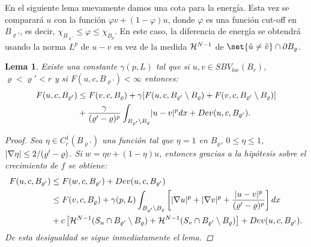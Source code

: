 \documentclass[a4paper,11pt,spanish, twoside, leqno]{tfm-uam}
\newtheorem{lema}[teo]{Lema}
\begin{document}
En el siguiente lema nuevamente damos una cota para la energía. Esta vez se comparará $u$ con la función $\varphi v+(1-\varphi)u$, donde $\varphi$ es una función cut-off en $B_{\varrho'}$, es decir, $\chi_{B_{\varrho'}}\le \varphi \le \chi_{B_{\varrho}}$. En este caso, la diferencia de energía se obtendrá usando la norma $L^{p}$ de $u-v$ en vez de la medida $\mathcal{H}^{N-1}$ de $\set{\tilde{u}\not = \tilde{v}}\cap \partial B_{\varrho}$. 
\begin{lema}\label{lema:estimacion de energia 2}
Existe una constante $\gamma(p,L)$ tal que si $u,v\in SBV_{loc}(B_{r})$, $\varrho<\varrho'<r$ y si $F(u,c,B_{\varrho'})<\infty$ entonces:
\begin{align*}
F(u,c,B_{\varrho'})&\leq F(v,c,B_{\varrho})+\gamma [F(u,c,B_{\varrho'}\setminus B_{\varrho})+F(v,c,B_{\varrho'}\setminus B_{\varrho})]
\\& +\dfrac{\gamma}{(\varrho'-\varrho)^{p}}\int_{B_{\varrho'}\setminus B_{\varrho}}\lvert u-v\rvert^{p}dx+Dev(u,c,B_{\varrho'}).
\end{align*}
\begin{proof}
Sea $\eta\in C_{c}^{1}(B_{\varrho'})$ una función tal que $\eta=1$ en $B_{\varrho}$, $0\leq \eta\leq 1$, $\lvert\nabla{\eta}\rvert\leq 2/(\varrho'-\varrho)$. Si $w=\eta v+(1-\eta)u$, entonces gracias a la hipótesis sobre el crecimiento de $f$ se obtiene:
\begin{align*}
F(u, c, B_{\varrho'})&\leq F(w, c, B_{\varrho'})+Dev(u,c,B_{\varrho'})
\\&\leq F(v,c,B_{\varrho})+\gamma(p,L)\int_{B_{\varrho'}\setminus B_{\varrho}}\left [ \lvert\nabla{u}\rvert^{p}+\lvert\nabla{v}\rvert^{p}+\dfrac{\lvert u-v\rvert^{p}}{(\varrho'-\varrho)^{p}}\right ]dx
\\&+c\left [ \mathcal{H}^{N-1}(S_{u}\cap B_{\varrho'}\setminus B_{\varrho} )+ \mathcal{H}^{N-1}(S_{v}\cap B_{\varrho'}\setminus B_{\varrho})\right]+Dev(u,c,B_{\varrho'}).
\end{align*}
De esta desigualdad se sigue inmediatamente el lema.
\end{proof}
\end{lema}
\end{document}
